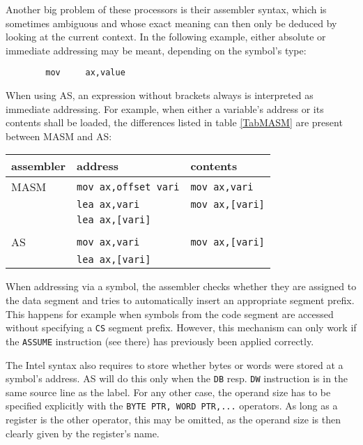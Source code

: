 \documentclass[12pt,twoside]{report}
\newcommand{\tty}[1]{{\tt #1}}
\newcommand{\asname}{{AS}}
\begin{document}
Another big problem of these processors is their assembler syntax,
which is sometimes ambiguous and whose exact meaning can then only be
deduced by looking at the current context.  In the following example,
either absolute or immediate addressing may be meant, depending on
the symbol's type:
\begin{verbatim}
        mov     ax,value
\end{verbatim}
When using \asname{}, an expression without brackets always is interpreted
as immediate addressing.  For example, when either a variable's
address or its contents shall be loaded, the differences listed in table
\ref{TabMASM} are present between MASM and \asname{}:
\begin{table*}
\begin{center}\begin{tabular}{|l|l|l|}
\hline
assembler  & address             & contents \\
\hline
\hline
MASM       &  \tty{mov ax,offset vari} &  \tty{mov ax,vari} \\
           &  \tty{lea ax,vari}        &  \tty{mov ax,[vari]} \\
           &  \tty{lea ax,[vari]}      & \\
           &                           & \\
\asname{}         &  \tty{mov ax,vari}        &  \tty{mov ax,[vari]} \\
           &  \tty{lea ax,[vari]}      & \\
\hline
\end{tabular}\end{center}
\caption{Differences \asname{}$\leftrightarrow$MASM Concerning Addressing
         Syntax\label{TabMASM}}
\end{table*}
\par
When addressing via a symbol, the assembler checks whether they are
assigned to the data segment and tries to automatically insert an
appropriate segment prefix.  This happens for example when symbols
from the code segment are accessed without specifying a \tty{CS} segment
prefix.  However, this mechanism can only work if the \tty{ASSUME}
instruction (see there) has previously been applied correctly.

The Intel syntax also requires to store whether bytes or words were
stored at a symbol's address.  \asname{} will do this only when the \tty{DB} resp.
\tty{DW} instruction is in the same source line as the label.  For any
other case, the operand size has to be specified explicitly with the
\tty{BYTE PTR, WORD PTR,...} operators.  As long as a register is the other
operator, this may be omitted, as the operand size is then clearly
given by the register's name.
\end{document}
